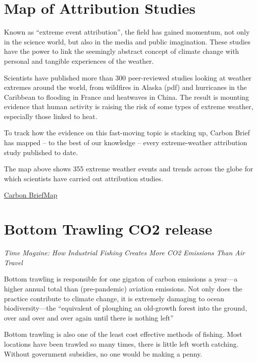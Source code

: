 \documentclass[
]{book}
\begin{document}
\hypertarget{map-of-attribution-studies}{%
\section{Map of Attribution Studies}\label{map-of-attribution-studies}}

Known as ``extreme event attribution'', the field has gained momentum, not only in the science world, but also in the media and public imagination. These studies have the power to link the seemingly abstract concept of climate change with personal and tangible experiences of the weather.

Scientists have published more than 300 peer-reviewed studies looking at weather extremes around the world, from wildfires in Alaska (pdf) and hurricanes in the Caribbean to flooding in France and heatwaves in China. The result is mounting evidence that human activity is raising the risk of some types of extreme weather, especially those linked to heat.

To track how the evidence on this fast-moving topic is stacking up, Carbon Brief has mapped -- to the best of our knowledge -- every extreme-weather attribution study published to date.

The map above shows 355 extreme weather events and trends across the globe for which scientists have carried out attribution studies.

\href{https://www.carbonbrief.org/mapped-how-climate-change-affects-extreme-weather-around-the-world}{Carbon BriefMap}

\hypertarget{bottom-trawling-co2-release}{%
\section{Bottom Trawling CO2 release}\label{bottom-trawling-co2-release}}

\emph{Time Magzine: How Industrial Fishing Creates More CO2 Emissions Than Air Travel}

Bottom trawling is responsible for one gigaton of carbon emissions a year---a higher annual total than (pre-pandemic) aviation emissions. Not only does the practice contribute to climate change, it is extremely damaging to ocean biodiversity---the ``equivalent of ploughing an old-growth forest into the ground, over and over and over again until there is nothing left''

Bottom trawling is also one of the least cost effective methods of fishing. Most locations have been trawled so many times, there is little left worth catching.
Without government subsidies, no one would be making a penny.
\end{document}
